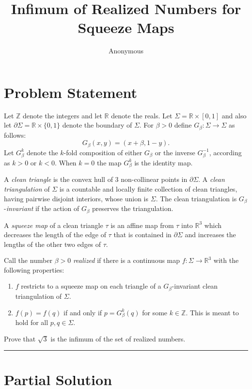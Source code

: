 \documentclass[12pt]{article}
\title{Infimum of Realized Numbers for Squeeze Maps}
\author{Anonymous}
\date{}
\begin{document}
\maketitle

\section*{Problem Statement}

Let $\mathbb{Z}$ denote the integers and let $\mathbb{R}$ denote the reals.
Let $\Sigma= \mathbb{R} \times [0,1]$ and also let $\partial \Sigma=\mathbb{R} \times \{0,1\}$ denote the boundary of $\Sigma$. 
For $\beta>0$ define $G_{\beta}: \Sigma \to \Sigma$ as follows:
\[
G_{\beta}(x,y)=(x+\beta,1-y).
\]
Let $G_{\beta}^k$ denote the $k$-fold composition of either $G_{\beta}$ or the inverse $G_{\beta}^{-1}$, according as $k>0$ or $k<0$. When $k=0$ the map $G_{\beta}^k$ is the identity map.

A \textit{clean triangle} is the convex hull of $3$ non-collinear points in $\partial \Sigma$. 
A \textit{clean triangulation} of $\Sigma$ is a countable and locally finite collection of clean triangles, having pairwise disjoint interiors, whose union is $\Sigma$. The clean triangulation is $G_{\beta}$-\textit{invariant} if the action of $G_{\beta}$ preserves the triangulation.

A \textit{squeeze map} of a clean triangle $\tau$ is an affine map from $\tau$ into $\mathbb{R}^3$ which decreases the length of the edge of $\tau$ that is contained in $\partial \Sigma$ and increases the lengths of the other two edges of $\tau$.

Call the number $\beta>0$ \textit{realized} if there is a continuous map $f: \Sigma \to \mathbb{R}^3$ with the following properties:
\begin{enumerate}
\item $f$ restricts to a squeeze map on each triangle of a $G_{\beta}$-invariant clean triangulation of $\Sigma$.
\item $f(p)=f(q)$ if and only if $p=G_{\beta}^k(q)$ for some $k \in \mathbb{Z}$. This is meant to hold for all $p,q \in \Sigma$.
\end{enumerate}
Prove that $\sqrt 3$ is the infimum of the set of realized numbers.

\vspace{1em}
\hrule
\vspace{1em}

\section*{Partial Solution}
\end{document}
